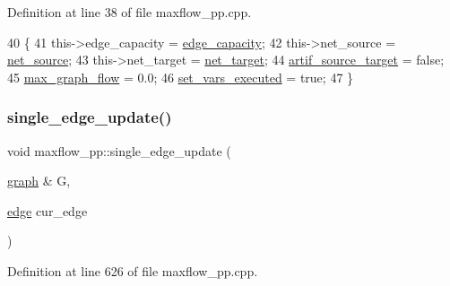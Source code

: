 Definition at line 38 of file maxflow\+\_\+pp.\+cpp.


\begin{DoxyCode}
40 \{
41     this->edge\_capacity = \mbox{\hyperlink{classmaxflow__pp_af3cdc4999a86322271a80b1855d58629}{edge\_capacity}};
42     this->net\_source = \mbox{\hyperlink{classmaxflow__pp_a20f2d05465acc2d7b777ea8025d12003}{net\_source}};
43     this->net\_target = \mbox{\hyperlink{classmaxflow__pp_a10f0b047011e04cb4816a824da5b7892}{net\_target}};
44     \mbox{\hyperlink{classmaxflow__pp_a21263af726420d377e404d816f31ed45}{artif\_source\_target}} = \textcolor{keyword}{false};
45     \mbox{\hyperlink{classmaxflow__pp_abdda1871e70fd2de0f2006eff57dc94e}{max\_graph\_flow}} = 0.0;
46     \mbox{\hyperlink{classmaxflow__pp_a6642619150b9c12790df2171cfa2c05f}{set\_vars\_executed}} = \textcolor{keyword}{true};
47 \}
\end{DoxyCode}
\mbox{\label{classmaxflow__pp_a3e59652a416d1553f8a1d1229dd2cd38}} 
\subsubsection{\texorpdfstring{single\+\_\+edge\+\_\+update()}{single\_edge\_update()}}
{\footnotesize\ttfamily void maxflow\+\_\+pp\+::single\+\_\+edge\+\_\+update (\begin{DoxyParamCaption}\item[{\mbox{\hyperlink{classgraph}{graph}} \&}]{G,  }\item[{\mbox{\hyperlink{classedge}{edge}}}]{cur\+\_\+edge }\end{DoxyParamCaption})\hspace{0.3cm}{\ttfamily [protected]}}



Definition at line 626 of file maxflow\+\_\+pp.\+cpp.


